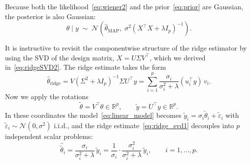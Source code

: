 Because both the likelihood~\eqref{eq:wiener2} and the
prior~\eqref{eq:prior} are Gaussian, the posterior is also Gaussian:
\begin{equation}
  \label{eq:posterior}
  \theta \mid y
  \;\sim\;
  \mathcal{N}\!\left(
    \hat\theta_{\mathrm{MAP}},\;
    \sigma^2\left(X^\top X + \lambda I_p\right)^{-1}
  \right).
\end{equation}

\medskip

It is instructive to revisit the componentwise structure of the ridge estimator by using the
SVD of the design matrix, $X=U \Sigma V^\top$, which we derived in~\eqref{eq:ridgeSVD2}. The ridge estimate takes the form
\begin{equation}
  \label{eq:ridge_svd1}
  \hat\theta_{\mathrm{ridge}}
  = V(\Sigma^2 + \lambda I_p)^{-1}\Sigma U^\top y
  = \sum_{i=1}^p
    \frac{\sigma_i}{\sigma_i^2 + \lambda}
    (u_i^\top y)\, v_i.
\end{equation}
Now we apply the rotations
\begin{equation}
  \label{eq:rotated_coords}
  \tilde\theta = V^\top\theta \in \mathbb{R}^p,
  \qquad
  \tilde y = U^\top y \in \mathbb{R}^p.
\end{equation}
In these coordinates the model~\eqref{eq:linear_model} becomes
$\tilde y_i = \sigma_i \tilde\theta_i + \tilde\varepsilon_i$ with
$\tilde\varepsilon_i \sim \mathcal{N}(0, \sigma^2)$ i.i.d., and the ridge
estimate~\eqref{eq:ridge_svd1} decouples into $p$ independent scalar problems:
\begin{equation}
  \label{eq:ridge_component}
  \hat{\tilde\theta}_i
  = \frac{\sigma_i}{\sigma_i^2 + \lambda}\,\tilde y_i
  = \frac{1}{\sigma_i}\cdot\frac{\sigma_i^2}{\sigma_i^2 + \lambda}\,\tilde y_i,
  \qquad i = 1, \ldots, p.
\end{equation}

